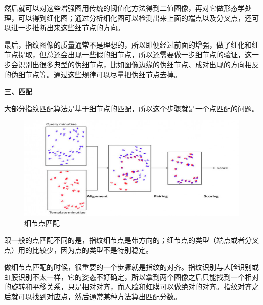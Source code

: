 \documentclass{article}
\begin{document}
	然后就可以对这些增强图用传统的阈值化方法得到二值图像，再对它做形态学处理，可以得到细化图；通过分析细化图可以检测出来上面的端点以及分叉点，还可以进一步推断出来这些细节点的方向。\par 

	最后，指纹图像的质量通常不是理想的，所以即便经过前面的增强，做了细化和细节点提取，但总还会出现一些假的细节点，所以还需要做一步细节点的验证，这一步会识别出很多典型的伪细节点，比如图像边缘的伪细节点、成对出现的方向相反的伪细节点等。通过这些规律可以尽量把伪细节点去掉。\par 

	\noindent\textbf{三、匹配}\par 

	大部分指纹匹配算法是基于细节点的匹配，所以这个步骤就是一个点匹配的问题。\par 
	\begin{figure}[h!]
	\centering
	\includegraphics[scale=0.5]{KMP.jpg}
	\caption{细节点匹配}
	\label{fig5}
	\end{figure}
	跟一般的点匹配不同的是，指纹细节点是带方向的；细节点的类型（端点或者分叉点）用的比较少，因为点的类型不是特别稳定。\par 

	做细节点匹配的时候，很重要的一个步骤就是指纹的对齐。指纹识别与人脸识别或虹膜识别不太一样，它的姿态不好确定，所以拿到两个图像之后只能找到一个相对的旋转和平移关系，只是相对对齐，而人脸和虹膜可以做绝对的对齐。指纹对齐之后就可以找到对应点，然后通常某种方法算出匹配分数。\par 
\end{document}
